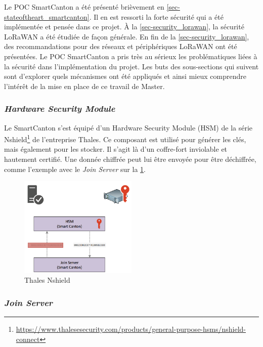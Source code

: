 

Le POC SmartCanton a été présenté brièvement en \cref{sec-stateoftheart_smartcanton}. Il en est ressorti la forte sécurité qui a été implémentée et pensée dans ce projet.
À la \cref{sec-security_lorawan}, la sécurité LoRaWAN a été étudiée de façon générale. En fin de la \cref{sec-security_lorawan}, des recommandations pour des réseaux et périphériques LoRaWAN ont été présentées. Le POC SmartCanton a pris très au sérieux les problématiques liées à la sécurité dans l'implémentation du projet. Les buts des sous-sections qui suivent sont d'explorer quels mécanismes ont été appliqués et ainsi mieux comprendre l'intérêt de la mise en place de ce travail de Master.


\subsubsection{\textit{Hardware Security Module}}

Le SmartCanton s'est équipé d'un Hardware Security Module (HSM) de la série Nshield\footnote{\url{https://www.thalesesecurity.com/products/general-purpose-hsms/nshield-connect}} de l'entreprise Thales. Ce composant est utilisé pour générer les clés, mais également pour les stocker. Il s'agit là d'un coffre-fort inviolable et hautement certifié. Une donnée chiffrée peut lui être envoyée pour être déchiffrée, comme l'exemple avec le \textit{Join Server} sur la \cref{fig-nshield_thales}.

\begin{figure}[ht!]
    \centering
    \includegraphics[width=0.5\textwidth]{Figures/Security/smartcanton/nshield_thales.png}
    \caption{Thales Nshield}
    \label{fig-nshield_thales}
\end{figure}



\subsubsection{\textit{Join Server}}

